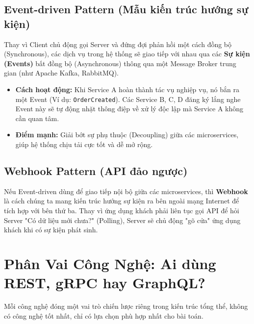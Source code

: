 \documentclass[12pt,a4paper]{article}
\begin{document}
\subsection{Event-driven Pattern (Mẫu kiến trúc hướng sự kiện)}
Thay vì Client chủ động gọi Server và đứng đợi phản hồi một cách đồng bộ (Synchronous), các dịch vụ trong hệ thống sẽ giao tiếp với nhau qua các \textbf{Sự kiện (Events)} bất đồng bộ (Asynchronous) thông qua một Message Broker trung gian (như Apache Kafka, RabbitMQ).
\begin{itemize}
    \item \textbf{Cách hoạt động:} Khi Service A hoàn thành tác vụ nghiệp vụ, nó bắn ra một Event (Ví dụ: \texttt{OrderCreated}). Các Service B, C, D đăng ký lắng nghe Event này sẽ tự động nhặt thông điệp về xử lý độc lập mà Service A không cần quan tâm.
    \item \textbf{Điểm mạnh:} Giải bớt sự phụ thuộc (Decoupling) giữa các microservices, giúp hệ thống chịu tải cực tốt và dễ mở rộng.
\end{itemize}

\subsection{Webhook Pattern (API đảo ngược)}
Nếu Event-driven dùng để giao tiếp nội bộ giữa các microservices, thì \textbf{Webhook} là cách chúng ta mang kiến trúc hướng sự kiện ra bên ngoài mạng Internet để tích hợp với bên thứ ba. Thay vì ứng dụng khách phải liên tục gọi API để hỏi Server "Có dữ liệu mới chưa?" (Polling), Server sẽ chủ động "gõ cửa" ứng dụng khách khi có sự kiện phát sinh.

\section{Phân Vai Công Nghệ: Ai dùng REST, gRPC hay GraphQL?}
Mỗi công nghệ đóng một vai trò chiến lược riêng trong kiến trúc tổng thể, không có công nghệ tốt nhất, chỉ có lựa chọn phù hợp nhất cho bài toán.
\end{document}
